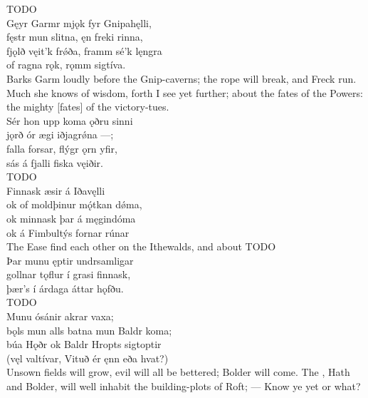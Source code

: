 \bvb TODO\\%

\bva Gęyr Garmr mjǫk \hld fyr Gnipahęlli, \\%
fęstr mun slitna, \hld ęn freki rinna, \\%
fjǫlð vęit’k frǿða, \hld framm sé’k lęngra \\%
of ragna rǫk, \hld rǫmm sigtíva.\\%

\bvb Barks Garm loudly before the Gnip-caverns; the rope will break, and Freck run. Much she knows of wisdom, forth I see yet further; about the fates of the Powers: the mighty [fates] of the victory-tues.\\%

\bva Sér hon upp koma \hld ǫðru sinni \\%
jǫrð ór ægi \hld iðjagrǿna —; \\%
falla forsar, \hld flýgr ǫrn yfir, \\%
sás á fjalli \hld fiska vęiðir.\\%

\bvb TODO\\%

\bva Finnask æsir \hld á Iðavęlli \\%
ok of moldþinur \hld mǫ́tkan dǿma, \\%
ok minnask þar \hld á męgindóma \\%
ok á Fimbultýs \hld fornar rúnar\\%

\bvb The Ease find each other on the Ithewalds, and about TODO\\%

\bva Þar munu ęptir \hld undrsamligar \\%
gollnar tǫflur \hld í grasi finnask, \\%
þær’s í árdaga \hld áttar hǫfðu.\\%

\bvb TODO\\%

\bva Munu ósánir \hld akrar vaxa; \\%
bǫls mun alls batna \hld mun Baldr koma; \\%
búa Hǫðr ok Baldr \hld Hropts sigtoptir \\%
(vęl valtívar, \hld Vituð ér ęnn eða hvat?)\\%

\bvb Unsown fields will grow, evil will all be bettered; Bolder will come. The , Hath and Bolder, will well inhabit the building-plots of Roft; — Know ye yet or what?\\%

